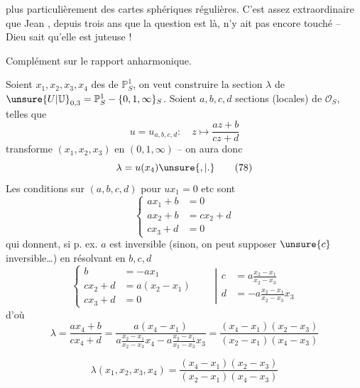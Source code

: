 
plus particulièrement des cartes sphériques
régulières. C'est assez extraordinaire que
Jean , depuis trois ans que la
question est là, n'y ait pas encore touché
-- Dieu sait qu'elle est juteuse !

Complément sur le rapport anharmonique.

Soient $x_1,x_2,x_3,x_4$ des  de
$\mathbb P^1_S$, on veut construire la section  $\lambda$
de $\unsure{U|\mathbb U}_{0,3}=\mathbb P^1_S-\{0,1,\infty\}_S$.
Soient $a,b,c,d$ sections
(locales) de $\mathcal O_S$,  telles que
\[
u=u_{a,b,c,d}:\quad z\longmapsto\frac{az+b}{cz+d}
\tag{77}
\]
transforme $(x_1,x_2,x_3)$ en $(0,1,\infty)$ -- on
aura donc
\[
\lambda=u(x_4)\unsure{,|.}
\tag{78}
\]
Les conditions sur  $(a,b,c,d)$ pour $ux_1=0$ etc sont
\[
\left\{\begin{aligned}
ax_1+b&=0\\
ax_2+b&=cx_2+d\\
cx_3+d&=0
\end{aligned}\right.
\]
qui donnent, si p. ex. $a$ est inversible (sinon, on
peut supposer $\unsure{c}$ inversible\ldots) en résolvant en $b,c,d$
\[
\left\{\begin{aligned}
b&=-ax_1\\
cx_2+d&=a(x_2-x_1)\\
cx_3+d&=0
\end{aligned}\right.
\qquad\left|\begin{aligned}
c&=a\frac{x_2-x_1}{x_2-x_3}\\
d&=-a\frac{x_2-x_1}{x_2-x_3}x_3
\end{aligned}\right.
\]
d'où
\[
\lambda=\frac{ax_4+b}{cx_4+d}
=\frac{a(x_4-x_1)}{a\frac{x_2-x_1}{x_2-x_3}x_4-a\frac{x_2-x_1}{x_2-x_3}x_3}
=\frac{(x_4-x_1)(x_2-x_3)}{(x_2-x_1)(x_4-x_3)}
\]


\[
\lambda(x_1,x_2,x_3,x_4)=\frac{(x_4-x_1)(x_2-x_3)}{(x_2-x_1)(x_4-x_3)}
\tag{79}
\]

